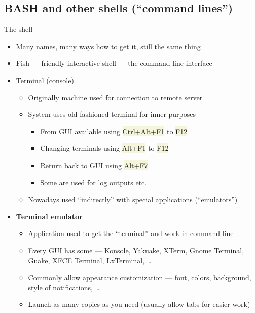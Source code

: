\documentclass[compress, xelatex, 11pt, xcolor=svgnames, aspectratio=169, url={hyphens, lowtilde}]{beamer}
\renewcommand{\texttt}[1]{\colorbox{Beige}{{\ttfamily #1}}}
\begin{document}
\subsection[SH]{BASH and other shells (\enquote{command lines})}

\begin{frame}{The shell}
	\begin{itemize}
		\item Many names, many ways how to get it, still the same thing
		\item Fish --- friendly interactive shell --- the command line interface
		\item Terminal (console)
		\begin{itemize}
			\item Originally machine used for connection to remote server
			\item System uses old fashioned terminal for inner purposes
			\begin{itemize}
				\item From GUI available using \texttt{Ctrl+Alt+F1} to \texttt{F12}
				\item Changing terminals using \texttt{Alt+F1} to \texttt{F12}
				\item Return back to GUI using \texttt{Alt+F7}
				\item Some are used for log outputs etc.
			\end{itemize}
			\item Nowadays used \enquote{indirectly} with special applications (\enquote{emulators})
		\end{itemize}
		\item \textbf{Terminal emulator}
		\begin{itemize}
			\item Application used to get the \enquote{terminal} and work in command line
			\item Every GUI has some --- \href{https://konsole.kde.org/}{Konsole}, \href{https://apps.kde.org/yakuake}{Yakuake}, \href{https://invisible-island.net/xterm/}{XTerm}, \href{https://wiki.gnome.org/Apps/Terminal}{Gnome Terminal}, \href{http://guake.org/}{Guake}, \href{https://docs.xfce.org/apps/terminal/start}{XFCE Terminal}, \href{https://github.com/lxde/lxterminal}{LxTerminal},~\ldots
			\item Commonly allow appearance customization --- font, colors, background, style of notifications,~\ldots
			\item Launch as many copies as you need (usually allow tabs for easier work)
		\end{itemize}
	\end{itemize}
\end{frame}
\end{document}
